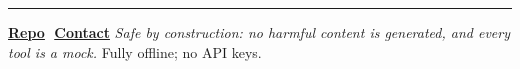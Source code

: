 \documentclass[a4paper,9pt]{extarticle}
\begin{document}
\vfill
\noindent\textcolor{accent!40}{\rule{\linewidth}{0.6pt}}

\vspace{0.15em}
\noindent\footnotesize%
\href{https://github.com/pleyva2004/redloop}{\textbf{Repo}}\,\textbar{}\,%
\href{mailto:pleyva2004@gmail.com}{\textbf{Contact}}\quad
\emph{Safe by construction: no harmful content is generated, and every tool is a mock.}\quad
Fully offline; no API keys.
\normalsize
\end{document}
